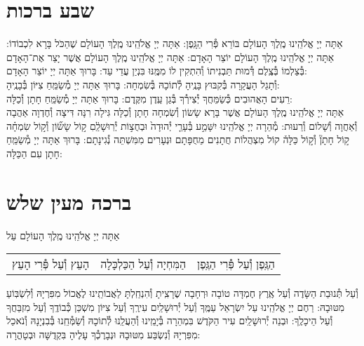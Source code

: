 \documentclass[twoside, openany, parskip=half, 11pt]{book}
\begin{document}
\section[שבע ברכות]{ שבע ברכות }

אַתָּה יְיָ אֱלֹהֵֽינוּ מֶֽלֶךְ הָעוֹלָם בּוֹרֵא פְּ֯רִי הַגָּֽפֶן:\hfill \break
{}
אַתָּה יְיָ אֱלֹהֵֽינוּ מֶֽלֶךְ הָעוֹלָם שֶׁהַכֹּל בָּרָא לִכְבוֹדוֹ:\hfill \break
{}
אַתָּה יְיָ אֱלֹהֵֽינוּ מֶֽלֶךְ הָעוֹלָם יוֹצֵר הָאָדָם:\hfill \break
{}
אַתָּה יְיָ אֱלֹהֵֽינוּ מֶֽלֶךְ הָעוֹלָם אֲשֶׁר יָצַר אֶת־הָאָדָם בְּ֯צַלְמוֹ
בְּ֯צֶֽלֶם דְּ֯מוּת תַּבְנִיתוֹ וְ֯הִתְקִין לוֹ מִמֶּֽנּוּ בִּנְיַן עֲדֵי עַד: בָּרוּךְ אַתָּה יְיָ יוֹצֵר הָאָדָם:\\
וְ֯תָגֵל הָעֲקָרָה בְּ֯קִבּוּץ בָּנֶֽיהָ לְ֯תוֹכָהּ בְּ֯שִׂמְחָה:
בָּרוּךְ אַתָּה יְיָ מְ֯שַׂמֵּֽחַ צִיּוֹן בְּ֯בָנֶֽיהָ:\\
רֵעִים הָאֲהוּבִים כְּ֯שַׂמֵּחֲךָ יְ֯צִירְ֯ךָ בְּ֯גַן עֵֽדֶן מִקֶּֽדֶם:
בָּרוּךְ אַתָּה יְיָ מְ֯שַׂמֵּֽחַ חָתָן וְ֯כַלָּה:\\
אַתָּה יְיָ אֱלֹהֵֽינוּ מֶֽלֶךְ הָעוֹלָם
אֲשֶׁר בָּרָא שָׂשׂוֹן וְ֯שִׂמְחָה חָתָן וְ֯כַלָּה גִּילָה רִנָּה דִּיצָה וְ֯חֶדְוָה
אַהֲבָה וְ֯אַחֲוָה וְ֯שָׁלוֹם וְ֯רֵעוּת:
מְ֯הֵרָה יְיָ אֱלֹהֵֽינוּ יִשָּׁמַ֣ע
בְּ֯עָרֵ֤י יְ֯הוּדָה֙ וּבְחֻצ֣וֹת יְ֯רֽוּשָׁלַֽ֔םִ
ק֣וֹל שָׂשׂ֞וֹן וְ֯ק֣וֹל שִׂמְחָ֗ה ק֣וֹל חָתָן֘ וְ֯ק֣וֹל כַּלָּה֒
קוֹל מִצְהֲלוֹת חֲתָנִים מֵחֻפָּתָם וּנְעָרִים מִמִּשְׁתֵּה נְ֯גִינָתָם:
בָּרוּךְ אַתָּה יְיָ מְ֯שַׂמֵּֽחַ חָתָן עִם הַכַּלָּה:


\nextpage

\section[ברכה מעין שלש]{ ברכה מעין שלש }


אַתָּה יְיָ אֱלֹהֵֽינוּ מֶֽלֶךְ הָעוֹלָם עַל

\begin{tabular}{>{\centering\arraybackslash}m{} | >{\centering\arraybackslash}m{} | >{\centering\arraybackslash}m{}}

הָעֵץ וְ֯עַל פְּ֯רִי הָעֵץ
&
הַמִּחְיָה וְ֯עַל הַכַּלְכָּלָה
&
הַגֶּֽפֶן וְ֯עַל פְּ֯רִי הַגֶּֽפֶן \\

\end{tabular}

וְ֯עַל תְּ֯נוּבַת הַשָּׂדֶה וְ֯עַל אֶֽרֶץ חֶמְדָּה טוֹבָה וּרְחָבָה
שֶׁרָצִֽיתָ וְ֯הִנְחַֽלְתָּ לַאֲבוֹתֵֽינוּ לֶאֱכוֹל מִפִּרְיָהּ וְ֯לִשְׂבּֽוֹעַ מִטּוּבָהּ:
רַחֶם יְיָ אֱלֹהֵֽינוּ עַל יִשְׂרָאֵל עַמֶּֽךָ וְ֯עַל יְ֯רוּשָׁלַֽיִם עִירֶֽךָ וְ֯עַל צִיּוֹן מִשְׁכַּן כְּ֯בוֹדֶֽךָ וְ֯עַל מִזְבַּחֲךָ וְ֯עַל הֵיכָלֶֽךָ: וּבְנֵה יְ֯רוּשָׁלַֽיִם עִיר הַקֹּדֶשׁ בִּמְהֵרָה בְּ֯יָמֵֽינוּ וְ֯הַעֲלֵֽנוּ לְ֯תוֹכָהּ וְ֯שַׂמְּ֯חֵֽנוּ בְּ֯בִנְיָנָהּ וְ֯נֹאכַל מִפִּרְיָהּ וְ֯נִשְׂבַּע מִטּוּבָהּ וּנְבָרֶכְ֯ךָ עָלֶיהָ בִּקְדֻשָּׁה וּבְטָהֳרָה:
\end{document}
